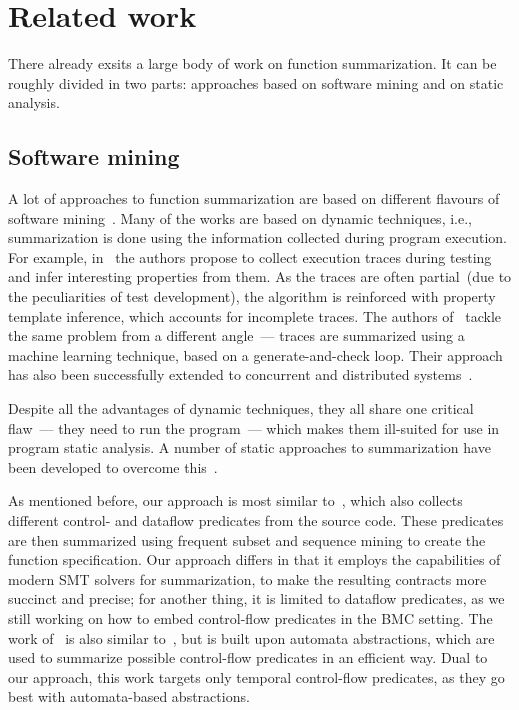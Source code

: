 \section{Related work}\label{sec:related-work}

There already exsits a large body of work on function summarization. It can be roughly divided in two parts: approaches based on software mining and on static analysis.

\subsection{Software mining}

A lot of approaches to function summarization are based on different flavours of software mining~\cite{Perracotta,Daikon,AssertsFromTraces,PredicateMining,AutomataMining}. Many of the works are based on dynamic techniques, i.e., summarization is done using the information collected during program execution. For example, in~\cite{Perracotta} the authors propose to collect execution traces during testing and infer interesting properties from them. As the traces are often partial~(due to the peculiarities of test development), the algorithm is reinforced with property template inference, which accounts for incomplete traces. The authors of~\cite{Daikon} tackle the same problem from a different angle~--- traces are summarized using a machine learning technique, based on a generate-and-check loop. Their approach has also been successfully extended to concurrent and distributed systems~\cite{CSight}.

Despite all the advantages of dynamic techniques, they all share one critical flaw~--- they need to run the program~--- which makes them ill-suited for use in program static analysis. A number of static approaches to summarization have been developed to overcome this~\cite{PredicateMining,AutomataMining}.

As mentioned before, our approach is most similar to~\cite{PredicateMining}, which also collects different control- and dataflow predicates from the source code. These predicates are then summarized using frequent subset and sequence mining to create the function specification. Our approach differs in that it employs the capabilities of modern SMT solvers for summarization, to make the resulting contracts more succinct and precise; for another thing, it is limited to dataflow predicates, as we still working on how to embed control-flow predicates in the BMC setting. The work of~\cite{AutomataMining} is also similar to~\cite{PredicateMining}, but is built upon automata abstractions, which are used to summarize possible control-flow predicates in an efficient way. Dual to our approach, this work targets only temporal control-flow predicates, as they go best with automata-based abstractions.

